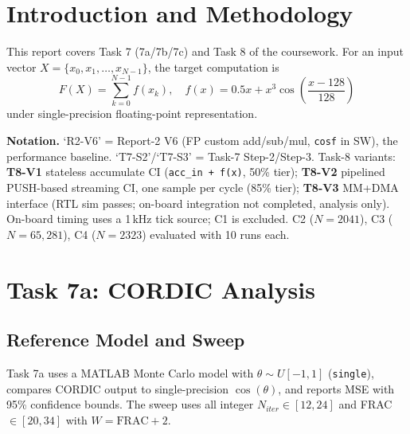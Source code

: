 \documentclass[a4paper,10pt,twocolumn]{article}
\begin{document}

\section{Introduction and Methodology}

This report covers Task 7 (7a/7b/7c) and Task 8 of the coursework.
For an input vector $X=\{x_0,x_1,\ldots,x_{N-1}\}$, the target computation is
\[
F(X)=\sum_{k=0}^{N-1} f(x_k),\quad f(x)=0.5x + x^3\cos\left(\frac{x-128}{128}\right)
\]
under single-precision floating-point representation.

\textbf{Notation.} `R2-V6' = Report-2 V6 (FP custom add/sub/mul, \texttt{cosf} in SW), the performance baseline. `T7-S2'/`T7-S3' = Task-7 Step-2/Step-3. Task-8 variants: \textbf{T8-V1} stateless accumulate CI (\texttt{acc\_in\,+\,f(x)}, 50\% tier); \textbf{T8-V2} pipelined PUSH-based streaming CI, one sample per cycle (85\% tier); \textbf{T8-V3} MM+DMA interface (RTL sim passes; on-board integration not completed, analysis only). On-board timing uses a 1\,kHz tick source; C1 is excluded. C2 ($N=2041$), C3 ($N=65{,}281$), C4 ($N=2323$) evaluated with 10 runs each.

\section{Task 7a: CORDIC Analysis}

\subsection{Reference Model and Sweep}
Task 7a uses a MATLAB Monte Carlo model with $\theta\sim U[-1,1]$ (\texttt{single}), compares CORDIC output to single-precision $\cos(\theta)$, and reports MSE with 95\% confidence bounds. The sweep uses all integer $N_{iter}\in[12,24]$ and FRAC$\in[20,34]$ with $W=\mathrm{FRAC}+2$.
\end{document}
